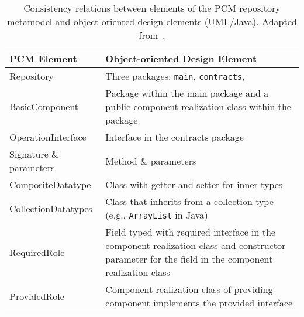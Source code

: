 \begin{table}
	\centering 
    \small
    \renewcommand{\arraystretch}{1.4}
	\begin{tabular}{p{3.2cm} p{6.6cm}}
		\toprule
        \textbf{\gls{PCM} Element}  & \textbf{Object-oriented Design Element} \\
        \midrule
		Repository              & Three packages: \texttt{main}, \texttt{contracts}, \text{datatypes} \\
		BasicComponent 		    & Package within the main package and a public component realization class within the package \\
		OperationInterface		& Interface in the contracts package \\
		Signature \& parameters & Method \& parameters \\
		CompositeDatatype       & Class with getter and setter for inner types\\
		CollectionDatatypes     & Class that inherits from a collection type (e.g., \texttt{ArrayList} in Java) \\
		RequiredRole		    & Field typed with required interface in the component realization class and constructor parameter for the field in the component realization class\\
		ProvidedRole		    & Component realization class of providing component implements the provided interface\\
		\bottomrule
	\end{tabular}
	\caption[Consistency relations between \acrshort{PCM} and \acrshort{UML}/Java]{Consistency relations between elements of the \gls{PCM} repository metamodel and object-oriented design elements (\gls{UML}/Java). Adapted from~\cite[Tab.~4.1]{langhammer2017a}.}
	\label{tab:foundations:pcm_oo_rules}
\end{table}

